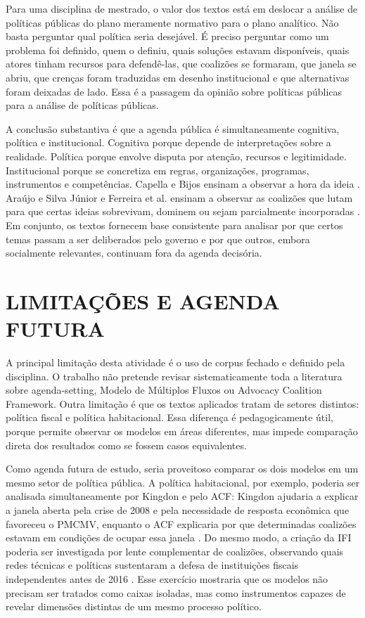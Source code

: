 \documentclass[12pt,a4paper]{article}
\begin{document}
Para uma disciplina de mestrado, o valor dos textos está em deslocar a análise de políticas públicas do plano meramente normativo para o plano analítico. Não basta perguntar qual política seria desejável. É preciso perguntar como um problema foi definido, quem o definiu, quais soluções estavam disponíveis, quais atores tinham recursos para defendê-las, que coalizões se formaram, que janela se abriu, que crenças foram traduzidas em desenho institucional e que alternativas foram deixadas de lado. Essa é a passagem da opinião sobre políticas públicas para a análise de políticas públicas.

A conclusão substantiva é que a agenda pública é simultaneamente cognitiva, política e institucional. Cognitiva porque depende de interpretações sobre a realidade. Política porque envolve disputa por atenção, recursos e legitimidade. Institucional porque se concretiza em regras, organizações, programas, instrumentos e competências. Capella e Bijos ensinam a observar a hora da ideia \autocites{capella2022multiplos}[][]{bijos2024ifi}. Araújo e Silva Júnior e Ferreira et al. ensinam a observar as coalizões que lutam para que certas ideias sobrevivam, dominem ou sejam parcialmente incorporadas \autocites{araujoSilva2022coalizoes}[][]{ferreira2019habitacional}. Em conjunto, os textos fornecem base consistente para analisar por que certos temas passam a ser deliberados pelo governo e por que outros, embora socialmente relevantes, continuam fora da agenda decisória.

\section{LIMITAÇÕES E AGENDA FUTURA}
\label{sec:orgd25ed4b}
A principal limitação desta atividade é o uso de corpus fechado e definido pela disciplina. O trabalho não pretende revisar sistematicamente toda a literatura sobre agenda-setting, Modelo de Múltiplos Fluxos ou Advocacy Coalition Framework. Outra limitação é que os textos aplicados tratam de setores distintos: política fiscal e política habitacional. Essa diferença é pedagogicamente útil, porque permite observar os modelos em áreas diferentes, mas impede comparação direta dos resultados como se fossem casos equivalentes.

Como agenda futura de estudo, seria proveitoso comparar os dois modelos em um mesmo setor de política pública. A política habitacional, por exemplo, poderia ser analisada simultaneamente por Kingdon e pelo ACF: Kingdon ajudaria a explicar a janela aberta pela crise de 2008 e pela necessidade de resposta econômica que favoreceu o PMCMV, enquanto o ACF explicaria por que determinadas coalizões estavam em condições de ocupar essa janela \autocites{kingdon2003agendas}[][]{ferreira2019habitacional}. Do mesmo modo, a criação da IFI poderia ser investigada por lente complementar de coalizões, observando quais redes técnicas e políticas sustentaram a defesa de instituições fiscais independentes antes de 2016 \autocites{sabatier1999theories}[][]{bijos2024ifi}. Esse exercício mostraria que os modelos não precisam ser tratados como caixas isoladas, mas como instrumentos capazes de revelar dimensões distintas de um mesmo processo político.

\printbibliography
\end{document}
